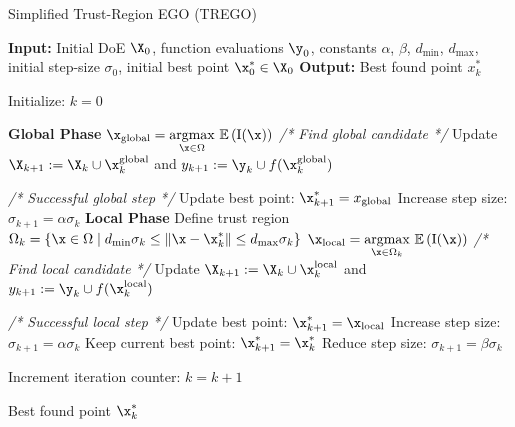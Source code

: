 \documentclass [PhD] {package/uclathes}
\begin{document}
\begin{algorithm}
\caption{Simplified Trust-Region EGO (TREGO)}
\label{alg:trego}
\begin{algorithmic}[1]
    \State \textbf{Input:} Initial DoE $\X_0$, function evaluations {$\y_0$}, constants  $\alpha$, $\beta$, $d_{\min}$, $d_{\max}$, initial step-size $\sigma_0$, initial best point $\x_0^* \in \X_0$
    \State \textbf{Output:} Best found point $x_k^*$

    \State Initialize: $k = 0$


        \State \textbf{Global Phase}
        \State $\x_{\text{global}} = \underset{\x \in \Omega}{\operatorname{argmax}} \ \mathbb{E}\left(\operatorname{I}(\x)\right) $ \hfill \textit{/* Find global candidate */}
        \State   Update $\X_{k+1} := \X_k \cup \x_k^{\text{global}}$ and $y_{k+1} := \y_k\cup f(\x_k^{\text{global}})$

          \hfill \textit{/* Successful global step */}
            \State Update best point: $\x_{k+1}^* = x_{\text{global}}$
            \State Increase step size: $\sigma_{k+1} = \alpha \sigma_k$
        \Else
            \State \textbf{Local Phase}
            \State Define trust region $\Omega_k = \{\x \in \Omega \mid d_{\min} \sigma_k \leq \|\x - \x_k^*\| \leq d_{\max} \sigma_k\}$
            \State $\x_{\text{local}} = \underset{\x \in \Omega_k}{\operatorname{argmax}} \ \mathbb{E}\left(\operatorname{I}(\x)\right)$ \hfill \textit{/* Find local candidate */}
            \State   Update $\X_{k+1} := \X_k \cup \x_k^{\text{local}}$ and $y_{k+1} := \y_k\cup f(\x_k^{\text{local}})$

             \hfill \textit{/* Successful local step */}
                \State Update best point: $\x_{k+1}^* = \x_{\text{local}}$
                \State Increase step size: $\sigma_{k+1} = \alpha \sigma_k$
            \Else
                \State Keep current best point: $\x_{k+1}^* = \x_k^*$
                \State Reduce step size: $\sigma_{k+1} = \beta \sigma_k$
            \EndIf
        \EndIf

        \State Increment iteration counter: $k = k + 1$
    \EndWhile

    \Return Best found point $\x_k^*$
\end{algorithmic}
\end{algorithm}
\end{document}
